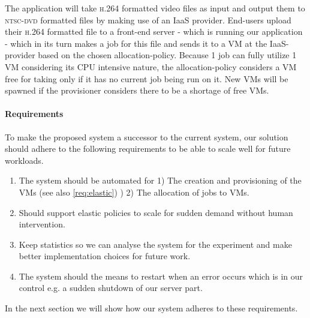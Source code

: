 The application will take \textsc{h.264} formatted video files as
input and output them to \textsc{ntsc-dvd} formatted files by making
use of an IaaS provider. End-users upload their \textsc{h.264}
formatted file to a front-end server - which is running our
application - which in its turn makes a job for this file and sends it
to a VM at the IaaS-provider based on the chosen
allocation-policy. Because 1 job can fully utilize 1 VM considering
its \textsc{CPU} intensive nature, the allocation-policy considers a
VM free for taking only if it has no current job being run on it. New
VMs will be spawned if the provisioner considers there to be a
shortage of free VMs.

\paragraph{Requirements}
To make the proposed system a successor to the current system, our
solution should adhere to the following requirements to be able to
scale well for future workloads.

\begin{enumerate}[i]
\item The system should be automated for 1) The creation and
  provisioning of the VMs (see also \ref{req:elastic}) ) 2) The
  allocation of jobs to VMs.
\item \label{req:elastic}Should support elastic policies to scale for
  sudden demand without human intervention.
\item Keep statistics so we can analyse the system for the experiment
  and make better implementation choices for future work.
\item The system should the means to restart when an error occurs
  which is in our control e.g. a sudden shutdown of our server part.
\end{enumerate}
In the next section we will show how our system adheres to these
requirements.
